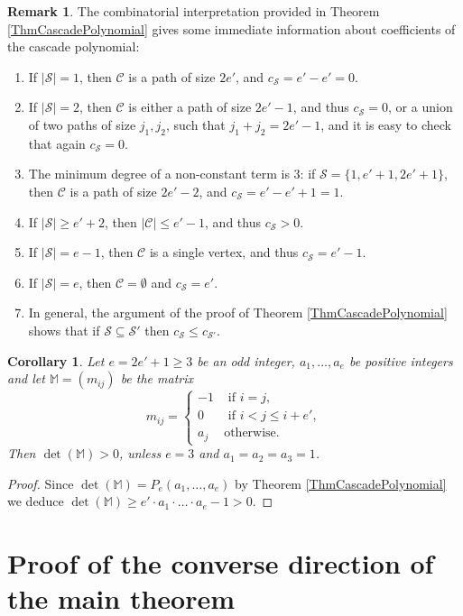 \documentclass[11pt,twoside]{amsart}
\newcommand{\cS}{\mathcal{S}}
\newcommand{\cC}{\mathcal{C}}
\def\bbM{{\mathbb M}}
\newtheorem{cor}[Theorem]{Corollary}
\theoremstyle{definition}
\newtheorem{rem}[Theorem]{Remark}
\numberwithin{equation}{section}
\begin{document}
\begin{rem}
The combinatorial interpretation provided in Theorem \ref{ThmCascadePolynomial} 
gives some immediate information about  coefficients of the cascade polynomial:
\begin{enumerate}
\item If $|\cS|=1$, then $\cC$ is a path of size $2e'$, and $c_\cS=e'-e'=0$.
\item If $|\cS|=2$, then $\cC$ is either a path of size $2e'-1$, and thus $c_\cS=0$, or a union of two paths of size $j_1,j_2$, such that $j_1+j_2=2e'-1$, and it is easy to check that again $c_\cS=0$.
\item The minimum degree of a non-constant term is  $3$: if $\cS=\{1,e'+1,2e'+1\}$, then $\cC$ is a path of size $2e'-2$, and $c_\cS=e'-e'+1=1$. 
\item If $|\cS| \ge e'+2$, then $|\cC| \le e'-1$, and thus  $c_{\cS} > 0$. 
\item If $|\cS|=e-1$, then $\cC$ is a single vertex, and thus $c_\cS=e'-1$.
\item If $|\cS|=e$, then $\cC = \emptyset$ and $c_\cS=e'$. 
\item In general, the argument of the proof of Theorem \ref{ThmCascadePolynomial} shows that if $\cS \subseteq \cS'$ then $c_\cS \le c_{\cS'}$.
\end{enumerate}
\end{rem}

\begin{cor}\label{detpos}
Let $e= 2e'+1\geq 3$ be an odd integer,  $a_1, \ldots , a_e$ be positive integers and let  $\bbM= (m_{ij})$ be the matrix
\[ m_{ij} = \left\{
\begin{array}{ll}
-1 & \text{ if }i=j, \\
0  & \text{ if } i < j \le i+e',  \\
a_j & \text{otherwise}.
\end{array}
\right.\]
Then $\det(\bbM) > 0$, unless $e=3$ and $a_1=a_2=a_3= 1$.
\end{cor}

\begin{proof}

Since $\det(\bbM) = P_e(a_1,\ldots,a_e)$ by Theorem \ref{ThmCascadePolynomial} we deduce $\det(\bbM) \ge e' \cdot a_1\cdot \ldots \cdot a_e - 1 > 0$.
\end{proof}


\section{Proof of the converse direction of the main theorem}
\end{document}
